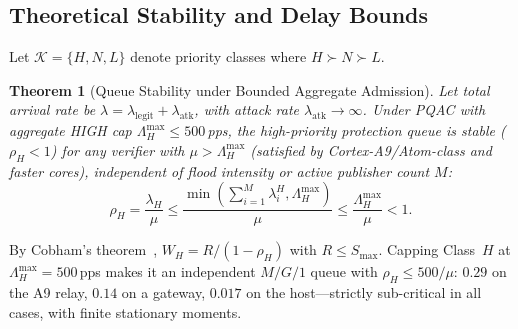 \documentclass[journal]{IEEEtran}
\newtheorem{theorem}{Theorem}
\newenvironment{proof}{\begin{IEEEproof}}{\end{IEEEproof}}
\begin{document}
\subsection{Theoretical Stability and Delay Bounds}
Let $\mathcal{K} = \{H, N, L\}$ denote priority classes where $H \succ N \succ L$.

\begin{theorem}[Queue Stability under Bounded Aggregate Admission]
\label{thm:stability}
Let total arrival rate be $\lambda = \lambda_{\text{legit}} + \lambda_{\text{atk}}$, with attack rate $\lambda_{\text{atk}} \to \infty$. Under PQAC with aggregate HIGH cap $\Lambda_H^{\max} \le 500$\,pps, the high-priority protection queue is stable ($\rho_H < 1$) for any verifier with $\mu > \Lambda_H^{\max}$ (satisfied by Cortex-A9/Atom-class and faster cores), independent of flood intensity or active publisher count $M$:
\begin{equation}
\rho_H = \frac{\lambda_H}{\mu} \le \frac{\min\left(\sum_{i=1}^M \lambda_i^H, \Lambda_H^{\max}\right)}{\mu} \le \frac{\Lambda_H^{\max}}{\mu} < 1.
\end{equation}
\end{theorem}
\begin{proof}
By Cobham's theorem~\cite{cobham1954priority}, $W_H=R/(1-\rho_H)$ with $R\le S_{\max}$. Capping Class~$H$ at $\Lambda_H^{\max}=500$\,pps makes it an independent $M/G/1$ queue with $\rho_H\le 500/\mu$: $0.29$ on the A9 relay, $0.14$ on a gateway, $0.017$ on the host---strictly sub-critical in all cases, with finite stationary moments.
\end{proof}
\end{document}
